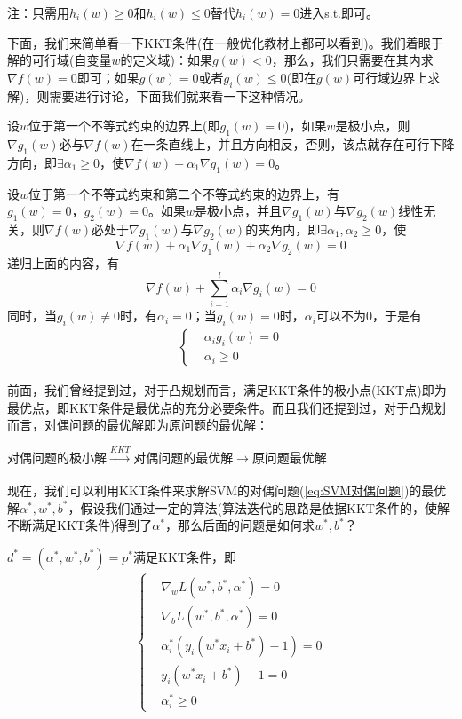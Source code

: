 		注：只需用$h_i(w) \geqslant 0$和$h_i(w) \leqslant 0$替代$h_i(w)=0$进入s.t.即可。
		\par
		下面，我们来简单看一下KKT条件(在一般优化教材上都可以看到)。我们着眼于解的可行域(自变量$w$的定义域)：如果$g(w)<0$，那么，我们只需要在其内求$\nabla f(w)=0$即可；如果$g(w)=0$或者$g_i(w) \leqslant 0$(即在$g(w)$可行域边界上求解)，则需要进行讨论，下面我们就来看一下这种情况。
		\par
		设$w$位于第一个不等式约束的边界上(即$g_1(w)=0$)，如果$w$是极小点，则$\nabla g_1(w)$必与$\nabla f(w)$在一条直线上，并且方向相反，否则，该点就存在可行下降方向，即$\exists \alpha_1 \geqslant 0$，使$\nabla f(w)+\alpha_1\nabla g_1(w)=0$。
		\par
		设$w$位于第一个不等式约束和第二个不等式约束的边界上，有$g_1(w)=0，g_2(w)=0$。如果$w$是极小点，并且$\nabla g_1(w)$与$\nabla g_2(w)$线性无关，则$\nabla f(w)$必处于$\nabla g_1(w)$与$\nabla g_2(w)$的夹角内，即$\exists \alpha_1,\alpha_2 \geqslant 0$，使
		\[
		\nabla f(w)+\alpha_1\nabla g_1(w)+\alpha_2\nabla g_2(w)=0
		\]
		递归上面的内容，有
		\[
		\nabla f(w)+\sum_{i=1}^l\alpha_i\nabla g_i(w)=0
		\]
		同时，当$g_i(w)\neq0$时，有$\alpha_i=0$；当$g_i(w)=0$时，$\alpha_i$可以不为0，于是有
		\begin{align*}
		\left\{
		\begin{aligned}
		& \alpha_i g_i (w) = 0 \\
		& \alpha_i \geqslant 0
		\end{aligned}
		\right.
		\end{align*}
		\par
		前面，我们曾经提到过，对于凸规划而言，满足KKT条件的极小点(KKT点)即为最优点，即KKT条件是最优点的充分必要条件。而且我们还提到过，对于凸规划而言，对偶问题的最优解即为原问题的最优解：
		\par
		\centerline{对偶问题的极小解$\xrightarrow[]{KKT}$对偶问题的最优解$\longrightarrow$原问题最优解}
		\par
		现在，我们可以利用KKT条件来求解SVM的对偶问题(\ref{eq:SVM对偶问题})的最优解$\alpha^*,w^*,b^*$，假设我们通过一定的算法(算法迭代的思路是依据KKT条件的，使解不断满足KKT条件)得到了$\alpha^*$，那么后面的问题是如何求$w^*,b^*$？
		\par
		$d^*=(\alpha^*,w^*,b^*)=p^*$满足KKT条件，即
		\begin{align*}
		\left\{
		\begin{aligned}
		& \nabla_w L(w^*, b^*, \alpha^*) = 0 \\
		& \nabla_b L(w^*, b^*, \alpha^*) = 0 \\
		& \alpha_i^* (y_i(w^* x_i + b^*) - 1) = 0 \\
		& y_i(w^* x_i + b^*) - 1 = 0 \\
		& \alpha_i^* \geqslant 0
		\end{aligned}
		\right.
		\end{align*}

